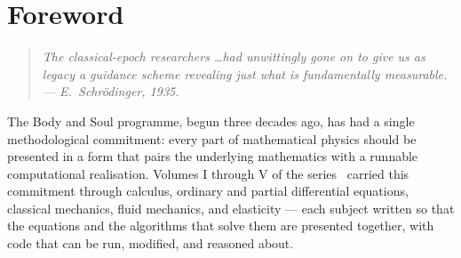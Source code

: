 
\chapter*{Foreword}

\begin{quote}
\itshape The classical-epoch researchers \ldots had unwittingly gone on to give us as legacy a guidance scheme revealing just what is fundamentally measurable.\\
\normalfont\hfill --- E.~Schr\"odinger, 1935.
\end{quote}

\bigskip

The Body and Soul programme, begun three decades ago, has had a single methodological commitment: every part of mathematical physics should be presented in a form that pairs the underlying mathematics with a runnable computational realisation. Volumes I through V of the series~\cite{BodyAndSoulI,BodyAndSoulII,BodyAndSoulIII,BodyAndSoulIV,BodyAndSoulV} carried this commitment through calculus, ordinary and partial differential equations, classical mechanics, fluid mechanics, and elasticity --- each subject written so that the equations and the algorithms that solve them are presented together, with code that can be run, modified, and reasoned about.

